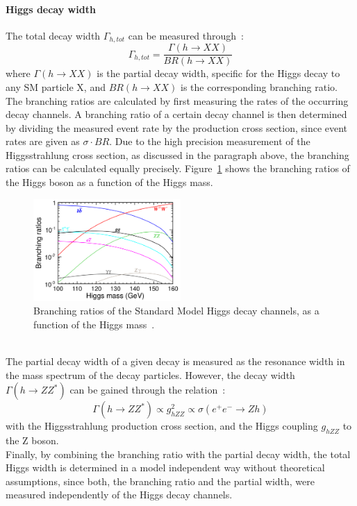 \paragraph{Higgs decay width}
The total decay width $\Gamma_{h,tot}$ can be measured through~\cite[p. 14]{PhysicsCase}:
\begin{equation}
 \Gamma_{h,tot}=\frac{\Gamma(h\rightarrow XX)}{BR(h\rightarrow XX)}
\end{equation}
where $\Gamma(h\rightarrow XX)$ is the partial decay width, specific for the Higgs decay to any SM particle X, and $BR(h\rightarrow XX)$ is the corresponding branching ratio.\\
The branching ratios are calculated by first measuring the rates of the occurring decay channels.
A branching ratio of a certain decay channel is then determined by dividing the measured event rate by the production cross section, since event rates are given as $\sigma\cdot BR$.
Due to the high precision measurement of the Higgsstrahlung cross section, as discussed in the paragraph above, the branching ratios can be calculated equally precisely.
Figure~\ref{fig:HiggsBR} shows the branching ratios of the Higgs boson as a function of the Higgs mass.
\begin{figure}[h]
\centering
\includegraphics[width=0.5\textwidth]{Figures/Higgs_BR.png}
\caption[Higgs decay branching ratios]{Branching ratios of the Standard Model Higgs decay channels, as a function of the Higgs mass~\cite[p. 15]{TDR2}.}
\label{fig:HiggsBR}
\end{figure}
\\The partial decay width of a given decay is measured as the resonance width in the mass spectrum of the decay particles.
However, the decay width $\Gamma(h\rightarrow ZZ^*)$ can be gained through the relation~\cite[p. 14]{PhysicsCase}:
\begin{equation}
 \Gamma(h\rightarrow ZZ^*)\propto g^2_{hZZ} \propto \sigma(e^+e^-\rightarrow Zh)
\end{equation}
with the Higgsstrahlung production cross section, and the Higgs coupling $g_{hZZ}$ to the Z boson. 
\\Finally, by combining the branching ratio with the partial decay width, the total Higgs width is determined in a model independent way without theoretical assumptions, since both, the branching ratio and the partial width, were measured independently of the Higgs decay channels.

